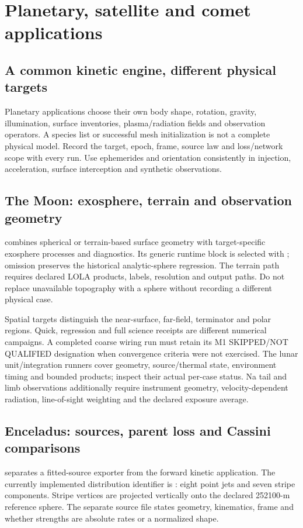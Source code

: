 \chapter{Planetary, satellite and comet applications}\label{ch:planetary}
\section{A common kinetic engine, different physical targets}
Planetary applications choose their own body shape, rotation, gravity,
illumination, surface inventories, plasma/radiation fields and observation
operators. A species list or successful mesh initialization is not a complete
physical model. Record the target, epoch, frame, source law and loss/network
scope with every run. Use ephemerides and orientation consistently in
injection, acceleration, surface interception and synthetic observations.

\section{The Moon: exosphere, terrain and observation geometry}
 combines spherical or terrain-based surface geometry with
target-specific exosphere processes and diagnostics. Its generic runtime
block is selected with ; omission preserves the historical
analytic-sphere regression. The terrain path requires declared LOLA products,
labels, resolution and output paths. Do not replace unavailable topography
with a sphere without recording a different physical case.

Spatial targets distinguish the near-surface, far-field, terminator and polar
regions. Quick, regression and full science receipts are different numerical
campaigns. A completed coarse wiring run must retain its M1
SKIPPED/NOT QUALIFIED designation when convergence criteria were not exercised.
The lunar unit/integration runners cover geometry, source/thermal state,
environment timing and bounded products; inspect their actual per-case status.
Na tail and limb observations additionally require instrument geometry,
velocity-dependent radiation, line-of-sight weighting and the declared
exposure average.

\section{Enceladus: sources, parent loss and Cassini comparisons}
 separates a fitted-source exporter from the forward kinetic
application. The currently implemented distribution identifier is
: eight point jets and seven stripe components.
Stripe vertices are projected vertically onto the declared 252100-m reference
sphere. The separate source file states geometry, kinematics, frame and
whether strengths are absolute rates or a normalized shape.

